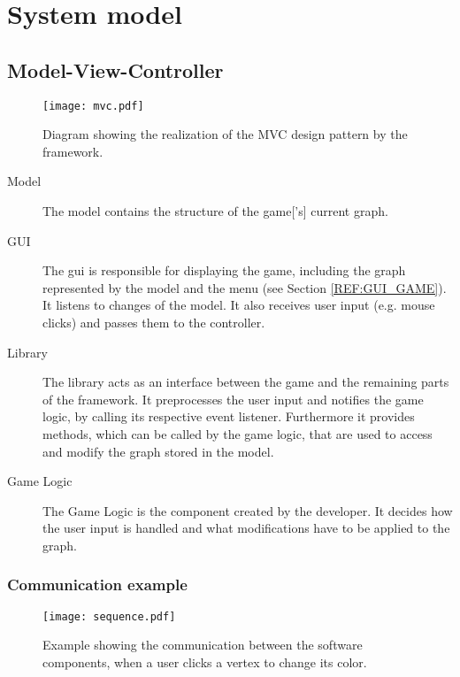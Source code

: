 \section{System model}

\subsection{Model-View-Controller}


\begin{figure}[h]
	\centering
	\texttt{[image: mvc.pdf]}
	\caption{Diagram showing the realization of the \gls{MVC} design pattern by the framework.}
	\label{img:MVC}
\end{figure}

\begin{description}
	\item[Model] The model contains the structure of the \gls{game}['s] current \gls{graph}.
	\item[GUI] The \gls{gui} is responsible for displaying the game, including the \gls{graph} represented by the model and the menu (see Section \ref{REF:GUI_GAME}). It listens to changes of the model. It also receives user input (e.g. mouse clicks) and passes them to the controller.
	\item[Library] The library acts as an interface between the game and the remaining parts of the framework. It preprocesses the user input and notifies the game logic, by calling its respective event listener. Furthermore it provides methods, which can be called by the game logic, that are used to access and modify the \gls{graph} stored in the model.
	\item[Game Logic] The Game Logic is the component created by the \gls{developer}. It decides how the user input is handled and what modifications have to be applied to the \gls{graph}. 
\end{description}

\subsubsection{Communication example}
\begin{figure}[h!]
	\centering
	\texttt{[image: sequence.pdf]}
	\caption{Example showing the communication between the software components, when a user clicks a vertex to change its color.}
	\label{img:SEQ}
\end{figure}
